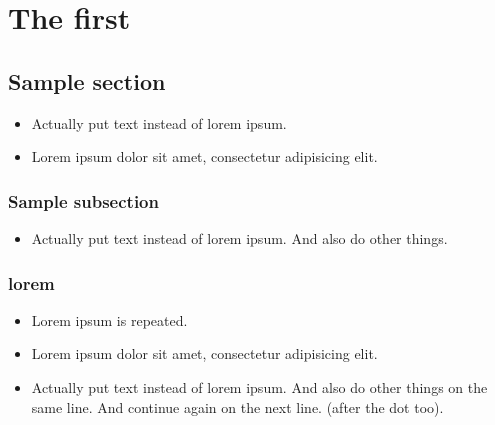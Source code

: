 \chapter{The first}
\label{autosec:0}
\vspace{-36pt}\hspace{11pt}
\section{Sample section}
\label{autosec:1}
    \begin{itemize}[noitemsep]
        \item {\color{red}Actually put text instead of lorem ipsum.}
        \item Lorem ipsum dolor sit amet, consectetur adipisicing elit.
    \end{itemize}
\subsection{Sample subsection}
\label{autosec:2}
    \begin{itemize}[noitemsep]
        \item {\color{red}Actually put text instead of lorem ipsum.}
{\color{red}And also do other things.}
    \end{itemize}
\subsection{lorem}
\label{autosec:3}
    \begin{itemize}[noitemsep]
        \item {\color{DarkOrchid}Lorem ipsum is repeated.}
        \item Lorem ipsum dolor sit amet, consectetur adipisicing elit.
        \item {\color{red}Actually put text instead of lorem ipsum. And also do other things on the same line.}
{\color{red}And continue again on the next line. (after the dot too).}
    \end{itemize}
